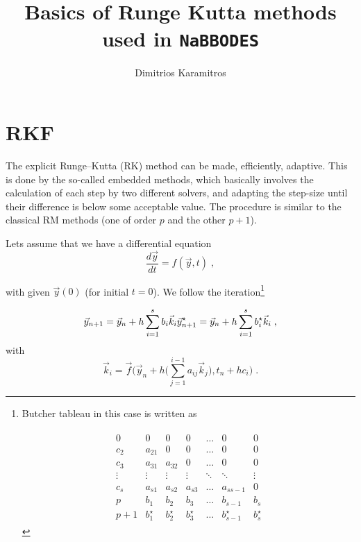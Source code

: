 \documentclass[11pt,a4paper]{article}
\author[ ]{Dimitrios Karamitros}
\affil[ ]{}
\affil[ ]{\textit{E-mail: } \href{mailto:dkaramit@yahoo.com}{\color{blue}{dkaramit@yahoo.com}}}
\title{Basics of Runge Kutta methods used in {\tt NaBBODES}}
\begin{document}
	
	\maketitle
	
	\section{RKF}\label{sec:RKF}
	\setcounter{equation}{0}
	The explicit Runge–Kutta (RK) method can be made, efficiently, adaptive. This is done
	by the so-called embedded methods, which basically involves the calculation of each step
	by two different solvers, and adapting the step-size until their difference is below some acceptable
	value. The procedure is similar to the classical RM methods (one of order $p$ and the other $p+1$).
	
	Lets assume that we have a differential equation
	\begin{equation}
		\dfrac{d\vec{y}}{dt}=f(\vec{y},t) \;,
	\end{equation}
	
	with  given $\vec{y}\left(0\right)$ (for initial $t=0$). We follow the iteration\footnote{
	
		Butcher tableau in this case is written as	
	
		\begin{eqnarray*}
		\begin{array}{c|cccccc}
			0      & 0      &   0   &      0& \dots & 0& 0\\
			c_2    & a_{21} &   0   &   0   & \dots & 0& 0\\
			c_3    & a_{31} & a_{32}&      0& \dots & 0& 0\\
			\vdots & \vdots & \vdots& \vdots&\ddots &\ddots& \vdots\\
			c_s    & a_{s1} & a_{s2}& a_{s3}& \dots & a_{s s-1}& 0 \\
			\hline
			p      & b_1    & b_2  & b_3 & \dots & b_{s-1} & b_s \\
			p+1      & b_1^{\star}    & b_2^{\star}  & b_3^{\star} & \dots & b_{s-1}^{\star} & b_s^{\star}
		\end{array}
		\end{eqnarray*}
	
	}
	
	$$
	\vec{y}_{n+1}=\vec{y}_{n}+ h\sum_{i=1}^{s} b_i \vec{k}_i \\
	\vec{y}^{\star}_{n+1}=\vec{y}_{n}+ h\sum_{i=1}^{s} b_i^{\star} \vec{k}_i \;,
	$$
	with
	$$
	\vec{k}_{i}=\vec f\Bigg(\vec{y}_{n}+h \Big(\sum_{j=1}^{i-1}a_{ij}\vec{k}_{j} \Big), t_{n}+h c_{i}   \Bigg)\;.
	$$
	
\end{document}
